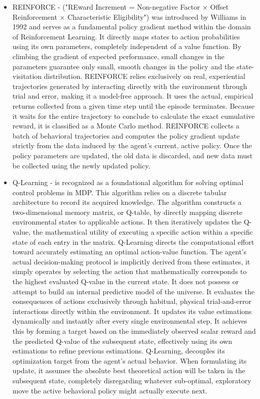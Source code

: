  \begin{itemize}

 	\item REINFORCE - ("REward Increment = Non-negative Factor × Offset Reinforcement × Characteristic Eligibility") was introduced by Williams in 1992 and serves as a fundamental policy gradient method within the domain of Reinforcement Learning. It directly maps states to action probabilities using its own parameters, completely independent of a value function. By climbing the gradient of expected performance, small changes in the parameters guarantee only small, smooth changes in the policy and the state-visitation distribution. REINFORCE relies exclusively on real, experiential trajectories generated by interacting directly with the environment through trial and error, making it a model-free approach. It uses the actual, empirical returns collected from a given time step until the episode terminates. Because it waits for the entire trajectory to conclude to calculate the exact cumulative reward, it is classified as a Monte Carlo method. REINFORCE collects a batch of behavioral trajectories and computes the policy gradient update strictly from the data induced by the agent's current, active policy. Once the policy parameters are updated, the old data is discarded, and new data must be collected using the newly updated policy. \cite{Deep-Learning-book} \cite{sutton1999policy}
 	\item Q-Learning - is recognized as a foundational algorithm for solving optimal control problems in MDP. This algorithm relies on a discrete tabular architecture to record its acquired knowledge. The algorithm constructs a two-dimensional memory matrix, or Q-table, by directly mapping discrete environmental states to applicable actions. It then iteratively updates the Q-value, the mathematical utility of executing a specific action within a specific state of each entry in the matrix.  Q-Learning directs the computational effort toward accurately estimating an optimal action-value function. The agent's actual decision-making protocol is implicitly derived from these estimates, it simply operates by selecting the action that mathematically corresponds to the highest evaluated Q-value in the current state. It does not possess or attempt to build an internal predictive model of the universe. It evaluates the consequences of actions exclusively through habitual, physical trial-and-error interactions directly within the environment. It updates its value estimations dynamically and instantly after every single environmental step. It achieves this by forming a target based on the immediately observed scalar reward and the predicted Q-value of the subsequent state, effectively using its own estimations to refine previous estimations. Q-Learning, decouples its optimization target from the agent's actual behavior. When formulating its update, it assumes the absolute best theoretical action will be taken in the subsequent state, completely disregarding whatever sub-optimal, exploratory move the active behavioral policy might actually execute next. \cite{NaeemMuddasar2020AGIt} %

\end{itemize}
